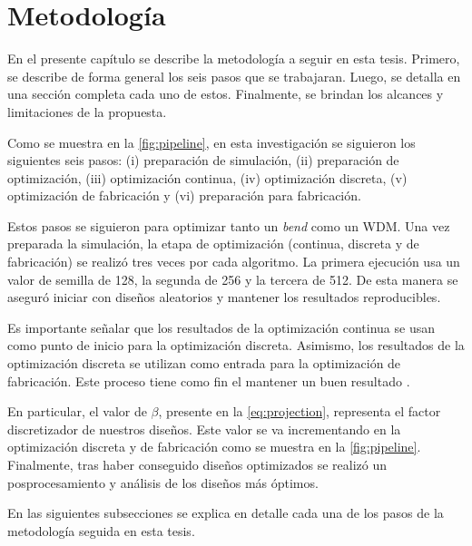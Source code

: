 \chapter{Metodología}\label{chapter:methodology}

En el presente capítulo se describe la metodología a seguir en esta tesis.
Primero, se describe de forma general los seis pasos que se trabajaran.
Luego, se detalla en una sección completa cada uno de estos.
Finalmente, se brindan los alcances y limitaciones de la propuesta.

Como se muestra en la \autoref{fig:pipeline}, en esta investigación se siguieron los siguientes seis pasos:
(i) preparación de simulación, 
(ii) preparación de optimización, 
(iii) optimización continua,
(iv) optimización discreta,
(v) optimización de fabricación y
(vi) preparación para fabricación.

Estos pasos se siguieron para optimizar tanto un \emph{bend} como un WDM.
Una vez preparada la simulación, la etapa de optimización (continua, discreta y de fabricación) se realizó
tres veces por cada algoritmo.
La primera ejecución usa un valor de semilla de 128, la segunda de 256 y la tercera de 512.
De esta manera se aseguró iniciar con diseños aleatorios y mantener los resultados reproducibles.

Es importante señalar que los resultados de la optimización continua se usan como punto de inicio
para la optimización discreta. Asimismo, los resultados de la optimización discreta se utilizan como
entrada para la optimización de fabricación.
Este proceso tiene como fin el mantener un buen resultado \citep{Yang2017}.


En particular, el valor de $\beta$, presente en la \autoref{eq:projection}, representa el factor discretizador de nuestros diseños.
Este valor se va incrementando en la optimización discreta y de fabricación como se muestra en la
\autoref{fig:pipeline}.
Finalmente, tras haber conseguido diseños optimizados se realizó un posprocesamiento y
análisis de los diseños más óptimos.

En las siguientes subsecciones se explica en detalle cada una de los pasos de la metodología seguida en esta tesis.

